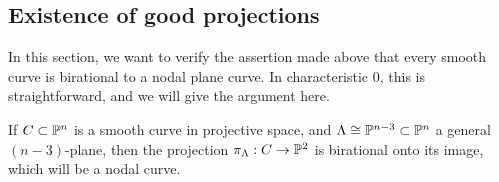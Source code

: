 \subsection{Existence of good projections}\label{projection section}

In this section, we want to verify the assertion made above that every smooth curve is birational to a nodal plane curve. In characteristic 0, this is straightforward, and we will give the argument here.

\begin{proposition}\label{nodal projection}
If $C \subset {\mathbb P}^n$ is a smooth curve in projective space, and $\Lambda \cong {\mathbb P}^{n-3} \subset {\mathbb P}^n$ a general $(n-3)$-plane, then the projection $\pi_\Lambda : C \to {\mathbb P}^2$ is birational onto its image, which will be a nodal curve.
\end{proposition}


